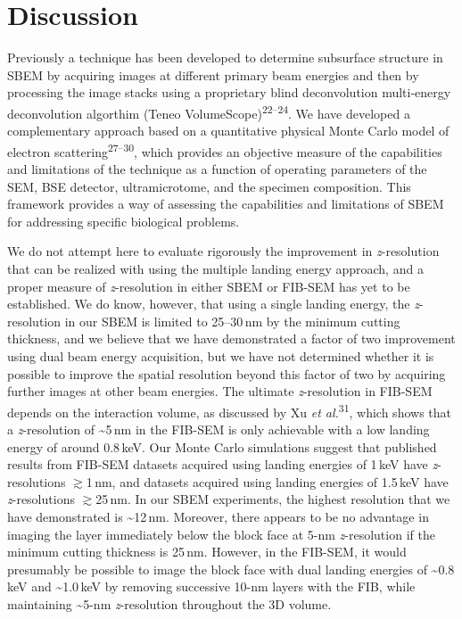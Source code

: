 \documentclass{article}
\newcommand{\cit}[1]{\textsuperscript{#1}}
\begin{document}
\section*{Discussion}

Previously a technique has been developed to determine subsurface structure in SBEM by acquiring images at different primary beam energies and then by processing the image stacks using a proprietary blind deconvolution multi-energy deconvolution algorthim (Teneo VolumeScope)\cit{22–24}. We have developed a complementary approach based on a quantitative physical Monte Carlo model of electron scattering\cit{27–30}, which provides an objective measure of the capabilities and limitations of the technique as a function of operating parameters of the SEM, BSE detector, ultramicrotome, and the specimen composition. This framework provides a way of assessing the capabilities and limitations of SBEM for addressing specific biological problems.

We do not attempt here to evaluate rigorously the improvement in \emph{z}-resolution that can be realized with using the multiple landing energy approach, and a proper measure of \emph{z}-resolution in either SBEM or FIB-SEM has yet to be established. We do know, however, that using a single landing energy, the \emph{z}-resolution in our SBEM is limited to 25–30\,nm by the minimum cutting thickness, and we believe that we have demonstrated a factor of two improvement using dual beam energy acquisition, but we have not determined whether it is possible to improve the spatial resolution beyond this factor of two by acquiring further images at other beam energies. The ultimate \emph{z}-resolution in FIB-SEM depends on the interaction volume, as discussed by Xu \emph{et al.}\cit{31}, which shows that a \emph{z}-resolution of \textasciitilde5\,nm in the FIB-SEM is only achievable with a low landing energy of around 0.8\,keV. Our Monte Carlo simulations suggest that published results from FIB-SEM datasets acquired using landing energies of 1\,keV have \emph{z}-resolutions $\gtrsim$1\,nm, and datasets acquired using landing energies of 1.5\,keV have \emph{z}-resolutions $\gtrsim$25\,nm. In our SBEM experiments, the highest resolution that we have demonstrated is \textasciitilde12\,nm. Moreover, there appears to be no advantage in imaging the layer immediately below the block face at 5-nm \emph{z}-resolution if the minimum cutting thickness is 25\,nm. However, in the FIB-SEM, it would presumably be possible to image the block face with dual landing energies of \textasciitilde0.8\,keV and \textasciitilde1.0\,keV by removing successive 10-nm layers with the FIB, while maintaining \textasciitilde5-nm \emph{z}-resolution throughout the 3D volume.
\end{document}
